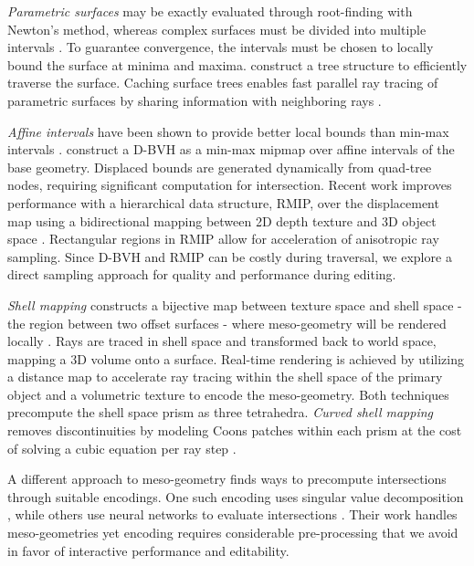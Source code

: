 \textit{Parametric surfaces} may be exactly evaluated through root-finding with Newton’s method, whereas complex surfaces must be divided into multiple intervals \cite{Toth1985}\cite{Joy1986}. To guarantee convergence, the intervals must be chosen to locally bound the surface at minima and maxima. \cite{Lischinski1990} construct a tree structure to efficiently traverse the surface. Caching surface trees enables fast parallel ray tracing of parametric surfaces by sharing information with neighboring rays \cite{Lamotte1991}. 

\textit{Affine intervals} have been shown to provide better local bounds than min-max intervals \cite{Knoll2009}. \cite{Thonat2021} construct a D-BVH as a min-max mipmap over affine intervals of the base geometry. Displaced bounds are generated dynamically from quad-tree nodes, requiring significant computation for intersection. Recent work improves performance with a hierarchical data structure, RMIP, over the displacement map using a bidirectional mapping between 2D depth texture and 3D object space  \cite{Thonat2023}. Rectangular regions in RMIP allow for acceleration of anisotropic ray sampling. Since D-BVH and RMIP can be costly during traversal, we explore a direct sampling approach for quality and performance during editing. 
 
\textit{Shell mapping} constructs a bijective map between texture space and shell space - the region between two offset surfaces - where meso-geometry will be rendered locally \cite{Porumbescu2005}. Rays are traced in shell space and transformed back to world space, mapping a 3D volume onto a surface. Real-time rendering is achieved by \cite{Ritsche2006} utilizing a distance map to accelerate ray tracing within the shell space of the primary object and a volumetric texture to encode the meso-geometry. Both techniques precompute the shell space prism as three tetrahedra.  \textit{Curved shell mapping} removes discontinuities by modeling Coons patches within each prism at the cost of solving a cubic equation per ray step \cite{Jeschke2007}.

A different approach to meso-geometry finds ways to precompute intersections through suitable encodings. One such encoding uses singular value decomposition \cite{Wang2003}, while others use neural networks to evaluate intersections \cite{Kuznetsov2021}. Their work handles meso-geometries yet encoding requires considerable pre-processing that we avoid in favor of interactive performance and editability.

